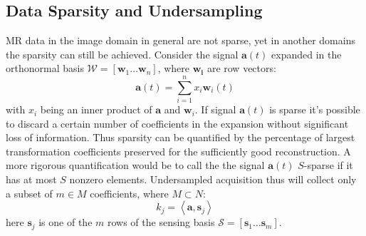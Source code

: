 \subsection{Data Sparsity and Undersampling}
MR data in the image domain in general are not sparse, yet in another domains the sparsity can still be achieved. 
Consider the signal $\mathbf{a}(t)$ expanded in the orthonormal basis $\mathcal{W}=\left[\mathbf{w}_1 \dots \mathbf{w}_n\right]$, where $\mathbf{w_i}$ are row vectors:
\begin{equation}\label{signal of interest}
\mathbf{a}(t) = \sum_{i=1}^n	x_i \mathbf{w}_i(t)
\end{equation}
with $x_i$ being an inner product of $\mathbf{a}$ and $\mathbf{w}_i$. 
If signal $\mathbf{a}(t)$ is sparse it's possible to discard a certain number of coefficients in the expansion without significant loss of information. 
Thus sparsity can be quantified by the percentage of largest transformation coefficients preserved for the sufficiently good reconstruction. 
A more rigorous quantification would be to call the the signal $\mathbf{a}(t)$ $S$-sparse if it has at most $S$ nonzero elements. 
Undersampled acquisition thus will collect only a subset of $m \in M$ coefficients, where $M \subset N$:
\begin{equation}
	k_j = \left< \mathbf{a}, \mathbf{s}_j \right>
\end{equation}
here $\mathbf{s}_j$ is one of the $m$ rows of the sensing basis $\mathcal{S} = [\mathbf{s}_1 \dots \mathbf{s}_m]$. 

